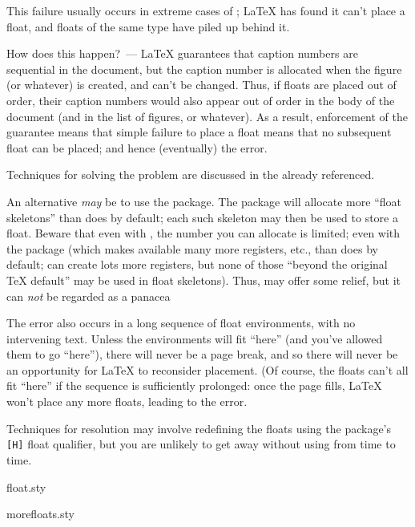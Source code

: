 This failure usually occurs in extreme cases of %
;
\LaTeX{} has found it can't place a float, and floats of the same type
have piled up behind it.

How does this happen?~--- \LaTeX{} guarantees that caption numbers are
sequential in the document, but the caption number is allocated when
the figure (or whatever) is created, and can't be changed.  Thus, if
floats are placed out of order, their caption numbers would also
appear out of order in the body of the document (and in the list of
figures, or whatever).  As a result, enforcement of the guarantee
means that simple failure to place a float means that no subsequent
float can be placed; and hence (eventually) the error.

Techniques for solving the problem are discussed in the %
 already referenced.

An alternative \emph{may} be to use the  package.
The package will allocate more ``float skeletons'' than \latex{}
does by default; each such skeleton may then be used to store a
float.  Beware that even with , the number you can
allocate is limited; even with the  package (which makes
available many more registers, etc., than \latex{} does by default;
\etex{} can create lots more registers, but none of those ``beyond
the original \TeX{} default'' may be used in float skeletons).  Thus,
 may offer some relief, but it can \emph{not} be
regarded as a panacea

The error also occurs in a long sequence of float environments, with
no intervening text.  Unless the environments will fit ``here'' (and
you've allowed them to go ``here''), there will never be a page break,
and so there will never be an opportunity for \LaTeX{} to reconsider
placement.  (Of course, the floats can't all fit ``here'' if the
sequence is sufficiently prolonged: once the page fills, \LaTeX{}
won't place any more floats, leading to the error.

Techniques for resolution may involve redefining the floats using the
 package's \texttt{[H]} float qualifier, but you are unlikely
to get away without using  from time to time.
\begin{ctanrefs}
\item[float.sty]
\item[morefloats.sty]
\end{ctanrefs}

